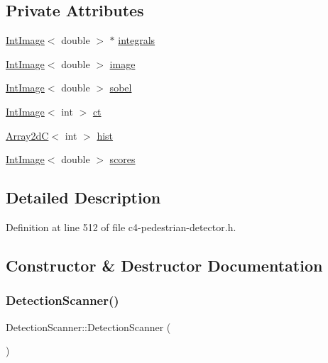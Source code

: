 \subsection*{Private Attributes}
\begin{DoxyCompactItemize}
\item 
\mbox{\hyperlink{class_int_image}{Int\+Image}}$<$ double $>$ $\ast$ \mbox{\hyperlink{class_detection_scanner_a0f64092660cd084b8a1d3b6e8e30cabb}{integrals}}
\item 
\mbox{\hyperlink{class_int_image}{Int\+Image}}$<$ double $>$ \mbox{\hyperlink{class_detection_scanner_aa4e4cfa6cc0a2ffd044c6cd9721a6b59}{image}}
\item 
\mbox{\hyperlink{class_int_image}{Int\+Image}}$<$ double $>$ \mbox{\hyperlink{class_detection_scanner_a03bc015aac34a51133881b760b929a6b}{sobel}}
\item 
\mbox{\hyperlink{class_int_image}{Int\+Image}}$<$ int $>$ \mbox{\hyperlink{class_detection_scanner_a885861d4c08a9f9ae4da36f68866419b}{ct}}
\item 
\mbox{\hyperlink{class_array2d_c}{Array2dC}}$<$ int $>$ \mbox{\hyperlink{class_detection_scanner_a3e46cb7413cad57d65fe4c35f959ea11}{hist}}
\item 
\mbox{\hyperlink{class_int_image}{Int\+Image}}$<$ double $>$ \mbox{\hyperlink{class_detection_scanner_a7358ec22675336179d3cad0809c7b883}{scores}}
\end{DoxyCompactItemize}


\subsection{Detailed Description}


Definition at line 512 of file c4-\/pedestrian-\/detector.\+h.



\subsection{Constructor \& Destructor Documentation}
\mbox{\label{class_detection_scanner_a535d5a56ab512b384b3888bab85ea5eb}} 
\subsubsection{\texorpdfstring{Detection\+Scanner()}{DetectionScanner()}\hspace{0.1cm}{\footnotesize\ttfamily [1/2]}}
{\footnotesize\ttfamily Detection\+Scanner\+::\+Detection\+Scanner (\begin{DoxyParamCaption}{ }\end{DoxyParamCaption})\hspace{0.3cm}{\ttfamily [inline]}}



